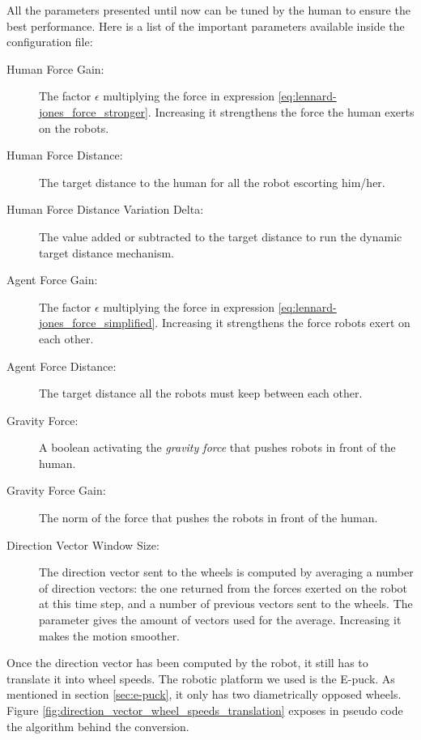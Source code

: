 \documentclass[oneside, a4paper, 12pt]{memoir}
\begin{document}
	All the parameters presented until now can be tuned by the human to ensure the best performance. Here is a list of the important parameters available inside the configuration file:
		
	\begin{description}
		\item[Human Force Gain:] The factor $\epsilon$ multiplying the force in expression \ref{eq:lennard-jones_force_stronger}. Increasing it strengthens the force the human exerts on the robots.
		\item[Human Force Distance:] The target distance to the human for all the robot escorting him/her.
		\item[Human Force Distance Variation Delta:] The value added or subtracted to the target distance to run the dynamic target distance mechanism.
		\item[Agent Force Gain:] The factor $\epsilon$ multiplying the force in expression \ref{eq:lennard-jones_force_simplified}. Increasing it strengthens the force robots exert on each other.
		\item[Agent Force Distance:] The target distance all the robots must keep between each other.
		\item[Gravity Force:] A boolean activating the \emph{gravity force} that pushes robots in front of the human.
		\item[Gravity Force Gain:] The norm of the force that pushes the robots in front of the human.
		\item[Direction Vector Window Size:] The direction vector sent to the wheels is computed by averaging a number of direction vectors: the one returned from the forces exerted on the robot at this time step, and a number of previous vectors sent to the wheels. The parameter gives the amount of vectors used for the average. Increasing it makes the motion smoother.
	\end{description}
	
	Once the direction vector has been computed by the robot, it still has to translate it into wheel speeds. The robotic platform we used is the E-puck. As mentioned in section \ref{sec:e-puck}, it only has two diametrically opposed wheels. Figure \ref{fig:direction_vector_wheel_speeds_translation} exposes in pseudo code the algorithm behind the conversion.
	
\end{document}
